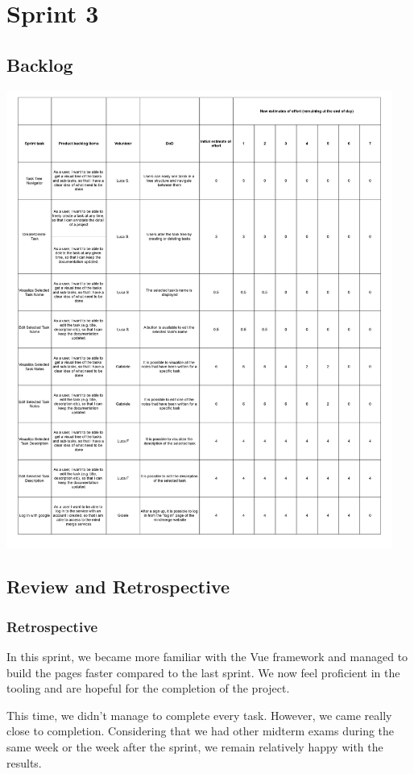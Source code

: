 \documentclass{article}
\begin{document}
\section{Sprint 3}

\subsection{Backlog}
\includegraphics[width=0.95\textwidth]{images/sprint_backlog_3.jpg}

\subsection{Review and Retrospective}
\subsubsection{Retrospective}
In this sprint, we became more familiar with the Vue framework and managed to build the pages faster compared to the last sprint. We now feel proficient in the tooling and are hopeful for the completion of the project.

This time, we didn’t manage to complete every task. However, we came really close to completion. Considering that we had other midterm exams during the same week or the week after the sprint, we remain relatively happy with the results.
\end{document}
